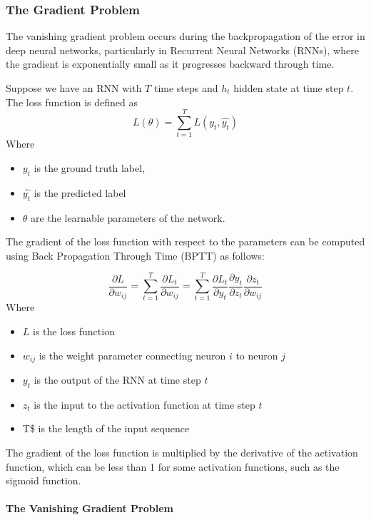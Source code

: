 \documentclass[
]{article}
\providecommand{\tightlist}{%
  \setlength{\itemsep}{0pt}\setlength{\parskip}{0pt}}
\begin{document}
\hypertarget{the-gradient-problem}{%
\subsubsection{The Gradient Problem}\label{the-gradient-problem}}

The vanishing gradient problem occurs during the backpropagation of the
error in deep neural networks, particularly in Recurrent Neural Networks
(RNNs), where the gradient is exponentially small as it progresses
backward through time.

Suppose we have an RNN with \(T\) time steps and \(h_t\) hidden state at
time step \(t\). The loss function is defined as
\[L(\theta) = \sum_{t=1}^T{L(y_t, \hat{y_t})}\] Where

\begin{itemize}
\tightlist
\item
  \(y_t\) is the ground truth label,
\item
  \(\hat{y_t}\) is the predicted label
\item
  \(\theta\) are the learnable parameters of the network.
\end{itemize}

The gradient of the loss function with respect to the parameters can be
computed using Back Propagation Through Time (BPTT) as follows:

\[ \frac{\partial L}{\partial w_{ij}} = \sum\limits_{t=1}^{T}\frac{\partial L_t}{\partial w_{ij}} = \sum\limits_{t=1}^{T}\frac{\partial L_t}{\partial y_t} \frac{\partial y_t}{\partial z_t} \frac{\partial z_t}{\partial w_{ij}} \]
Where

\begin{itemize}
\tightlist
\item
  \(L\) is the loss function
\item
  \(w_{ij}\) is the weight parameter connecting neuron \(i\) to neuron
  \(j\)
\item
  \(y_t\) is the output of the RNN at time step \(t\)
\item
  \(z_t\) is the input to the activation function at time step \(t\)
\item
  T\$ is the length of the input sequence
\end{itemize}

The gradient of the loss function is multiplied by the derivative of the
activation function, which can be less than 1 for some activation
functions, such as the sigmoid function.

\hypertarget{the-vanishing-gradient-problem}{%
\paragraph{The Vanishing Gradient
Problem}\label{the-vanishing-gradient-problem}}
\end{document}
